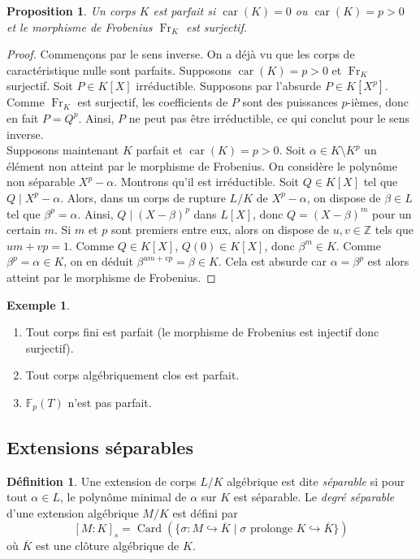 \documentclass{article}
\newcommand{\Z}{\mathbb{Z}}
\newcommand{\F}{\mathbb{F}}
\DeclareMathOperator{\Card}{Card}
\DeclareMathOperator{\car}{car}
\DeclareMathOperator{\Fr}{Fr}
\theoremstyle{plain}
\newtheorem{proposition}[theorem]{Proposition}
\theoremstyle{definition}
\newtheorem{definition}[theorem]{Définition}
\newtheorem{example}[theorem]{Exemple}
\theoremstyle{remark}
\begin{document}
\begin{proposition}
    Un corps $K$ est parfait si $\car(K) = 0$ ou $\car(K) = p > 0$ et le morphisme de Frobenius $\Fr_K$ est surjectif.
\end{proposition}

\begin{proof}
    Commençons par le sens inverse. On a déjà vu que les corps de caractéristique nulle sont parfaits. Supposons $\car(K) = p>0$ et $\Fr_K$ surjectif. Soit $P \in K[X]$ irréductible. Supposons par l'absurde $P \in K[X^p]$. Comme $\Fr_K$ est surjectif, les coefficients de $P$ sont des puissances $p$-ièmes, donc en fait $P = Q^p$. Ainsi, $P$ ne peut pas être irréductible, ce qui conclut pour le sens inverse. \\
    Supposons maintenant $K$ parfait et $\car(K) = p > 0$. Soit $\alpha \in K \setminus K^p$ un élément non atteint par le morphisme de Frobenius. On considère le polynôme non séparable $X^p - \alpha$. Montrons qu'il est irréductible. Soit $Q \in K[X]$ tel que $Q \mid X^p - \alpha$. Alors, dans un corps de rupture $L/K$ de $X^p -\alpha$, on dispose de $\beta \in L$ tel que $\beta^p = \alpha$. Ainsi, $Q \mid (X-\beta)^p$ dans $L[X]$, donc $Q = (X-\beta)^m$ pour un certain $m$. Si $m$ et $p$ sont premiers entre eux, alors on dispose de $u,v \in \Z$ tels que $um + vp = 1$. Comme $Q \in K[X]$, $Q(0) \in K[X]$, donc $\beta^m \in K$. Comme $\beta^p = \alpha \in K$, on en déduit $\beta^{um+vp} = \beta \in K$. Cela est absurde car $\alpha = \beta^p$ est alors atteint par le morphisme de Frobenius.
\end{proof}

\begin{example} \leavevmode
    \begin{enumerate}
        \item Tout corps fini est parfait (le morphisme de Frobenius est injectif donc surjectif).
        \item Tout corps algébriquement clos est parfait.
        \item $\F_p(T)$ n'est pas parfait.
    \end{enumerate}
\end{example}

\subsection{Extensions séparables}

\begin{definition}
    Une extension de corps $L/K$ algébrique est dite \emph{séparable} si pour tout $\alpha \in L$, le polynôme minimal de $\alpha$ sur $K$ est séparable. Le \emph{degré séparable} d'une extension algébrique $M/K$ est défini par
    \[[M : K]_s = \Card(\{\sigma : M \hookrightarrow \overline{K} \mid \sigma \text{ prolonge } K \hookrightarrow \overline{K}\})\]
    où $\overline{K}$ est une clôture algébrique de $K$.
\end{definition}
\end{document}

